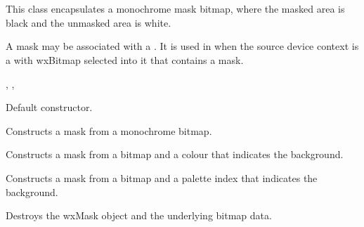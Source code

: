 \section{}\label{wxmask}

This class encapsulates a monochrome mask bitmap, where the masked area is black and
the unmasked area is white.




A mask may be associated with a . It is used in  when
the source device context is a  with wxBitmap selected into it that
contains a mask.


, , 


\label{wxmaskconstr}


Default constructor.


Constructs a mask from a monochrome bitmap.


Constructs a mask from a bitmap and a colour that indicates the background.


Constructs a mask from a bitmap and a palette index that indicates the background.







Destroys the wxMask object and the underlying bitmap data.

